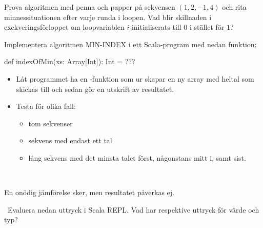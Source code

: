 \Subtask Prova algoritmen med penna och papper på sekvensen $(1, 2, -1, 4)$ och rita minnessituationen efter varje runda i loopen. Vad blir skillnaden i exekveringsförloppet om loopvariablen $i$  initialiserats till $0$ i stället för $1$?

\Subtask Implementera algoritmen MIN-INDEX i ett Scala-program med nedan funktion:
\begin{Code}
def indexOfMin(xs: Array[Int]): Int = ???
\end{Code}
\begin{itemize}
  \item Låt programmet ha en -funktion som ur  skapar en ny array med heltal som skickas till  och sedan gör en utskrift av resultatet.
  \item Testa för olika fall:
  \begin{itemize}
    \item tom sekvenser
    \item sekvens med endast ett tal
    \item lång sekvens med det minsta talet först, någonstans mitt i, samt sist.
  \end{itemize}
\end{itemize}


\SOLUTION

\TaskSolved \what~

\SubtaskSolved En onödig jämförelse sker, men resultatet påverkas ej.

\SubtaskSolved



\QUESTEND






\QUESTBEGIN

\Task  \what~Evaluera nedan uttryck i Scala REPL. Vad har respektive uttryck för värde och typ?

\Subtask {}

\Subtask {}

\Subtask {}

\Subtask {}

\Subtask {}

\Subtask {}

\Subtask {}

